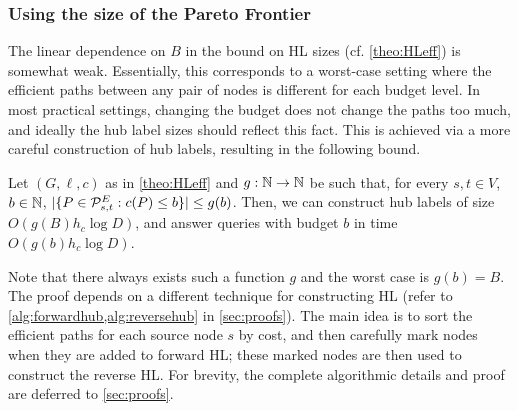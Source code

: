\documentclass[opre,nonblindrev]{informs3} %
\begin{document}
\subsubsection{Using the size of the Pareto Frontier}
\label{sec:frontier}
The linear dependence on $B$ in the bound on HL sizes (cf. \cref{theo:HLeff}) is somewhat weak. 
Essentially, this corresponds to a worst-case setting where the efficient paths between any pair of nodes is different for each budget level. 
In most practical settings, changing the budget does not change the paths too much, and ideally the hub label sizes should reflect this fact. 
This is achieved via a more careful construction of hub labels, resulting in the following bound. 
\begin{theorem}\label{thm:markedhubs}
Let $(G,\ell,c)$ as in \cref{theo:HLeff} and $g:\mathbb{N}\to \mathbb{N}$ be such that, for every $s,t\in V$, $b\in \mathbb{N}$, $\lvert\{P\in\mathcal{P}_{s,t}^E: c(P)\leq b\}\rvert \leq g(b)$.
Then, we can construct hub labels of size $O(g(B)h_c\log D)$, and answer queries with budget $b$ in time $O(g(b)h_c\log D)$.
\end{theorem}

Note that there always exists such a function $g$ and the worst case is $g(b)=B$.
The proof depends on a different technique for constructing HL (refer to \cref{alg:forwardhub,alg:reversehub} in \cref{sec:proofs}). 
The main idea is to sort the efficient paths for each source node $s$ by cost, and then carefully mark nodes when they are added to forward HL; these marked nodes are then used to construct the reverse HL.
For brevity, the complete algorithmic details and proof are deferred to \cref{sec:proofs}.
\end{document}
